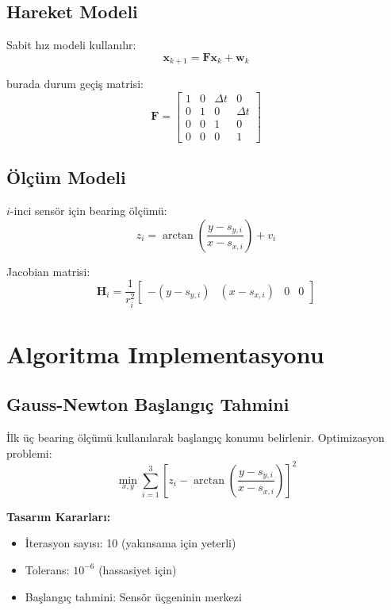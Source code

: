 \documentclass[11pt,a4paper]{article}
\begin{document}
\subsection{Hareket Modeli}
Sabit hız modeli kullanılır:
\begin{equation}
\mathbf{x}_{k+1} = \mathbf{F} \mathbf{x}_k + \mathbf{w}_k
\end{equation}

burada durum geçiş matrisi:
\begin{equation}
\mathbf{F} = \begin{bmatrix}
1 & 0 & \Delta t & 0 \\
0 & 1 & 0 & \Delta t \\
0 & 0 & 1 & 0 \\
0 & 0 & 0 & 1
\end{bmatrix}
\end{equation}

\subsection{Ölçüm Modeli}
$i$-inci sensör için bearing ölçümü:
\begin{equation}
z_i = \arctan\left(\frac{y - s_{y,i}}{x - s_{x,i}}\right) + v_i
\end{equation}

Jacobian matrisi:
\begin{equation}
\mathbf{H}_i = \frac{1}{r_i^2} \begin{bmatrix}
-(y - s_{y,i}) & (x - s_{x,i}) & 0 & 0
\end{bmatrix}
\end{equation}

\section{Algoritma Implementasyonu}

\subsection{Gauss-Newton Başlangıç Tahmini}
İlk üç bearing ölçümü kullanılarak başlangıç konumu belirlenir. Optimizasyon problemi:
\begin{equation}
\min_{x,y} \sum_{i=1}^{3} \left[ z_i - \arctan\left(\frac{y - s_{y,i}}{x - s_{x,i}}\right) \right]^2
\end{equation}

\textbf{Tasarım Kararları:}
\begin{itemize}
    \item İterasyon sayısı: 10 (yakınsama için yeterli)
    \item Tolerans: $10^{-6}$ (hassasiyet için)
    \item Başlangıç tahmini: Sensör üçgeninin merkezi
\end{itemize}
\end{document}
